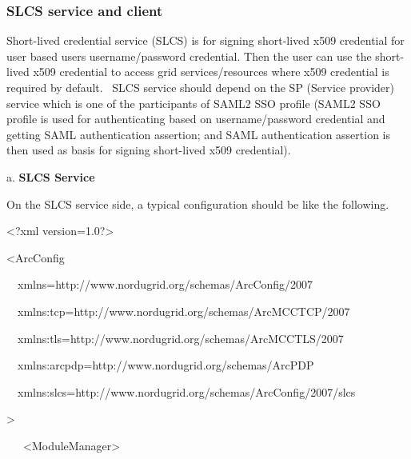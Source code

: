 \documentclass{article}
\begin{document}
\subsubsection{SLCS service and client}
{\color{black}
Short-lived credential service (SLCS) is for signing short-lived x509
credential for user based user{\textquotesingle}s username/password
credential. Then the user can use the short-lived x509 credential to
access grid services/resources where x509 credential is required by
default. \ SLCS service should depend on the SP (Service provider)
service which is one of the participants of SAML2 SSO profile (SAML2
SSO profile is used for authenticating based on username/password
credential and getting SAML authentication assertion; and SAML
authentication assertion is then used as basis for signing short-lived
x509 credential).}

{\color{black}
a. \textbf{SLCS Service} }

{\color{black}
On the SLCS service side, a typical configuration should be like the
following.}

{\ttfamily\color{black}
{\textless}?xml version={\textquotedbl}1.0{\textquotedbl}?{\textgreater}
}

{\ttfamily\color{black}
{\textless}ArcConfig }

{\ttfamily\color{black}
\ \ xmlns={\textquotedbl}http://www.nordugrid.org/schemas/ArcConfig/2007{\textquotedbl}
}

{\ttfamily\color{black}
\ \ xmlns:tcp={\textquotedbl}http://www.nordugrid.org/schemas/ArcMCCTCP/2007{\textquotedbl}
}

{\ttfamily\color{black}
\ \ xmlns:tls={\textquotedbl}http://www.nordugrid.org/schemas/ArcMCCTLS/2007{\textquotedbl}
}

{\ttfamily\color{black}
\ \ xmlns:arcpdp={\textquotedbl}http://www.nordugrid.org/schemas/ArcPDP{\textquotedbl}
}

{\ttfamily\color{black}
\ \ xmlns:slcs={\textquotedbl}http://www.nordugrid.org/schemas/ArcConfig/2007/slcs{\textquotedbl}
}

{\ttfamily\color{black}
{\textgreater} }

{\ttfamily\color{black}
\ \ \ {\textless}ModuleManager{\textgreater} }
\end{document}
